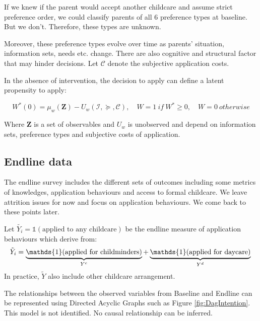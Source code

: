 \documentclass[
]{article}
\newcommand{\one}[1]{\mathds{1}( #1 )}
\begin{document}
If we knew if the parent would accept another childcare and assume strict preference order, we could classify parents of all 6 preference types at baseline. But we don't. Therefore, these types are unknown.

Moreover, these preference types evolve over time as parents' situation, information sets, needs etc. change.
There are also cognitive and structural factor that may hinder decisions. Let \(\mathcal{C}\) denote the subjective application costs.

In the absence of intervention, the decision to apply can define a latent propensity to apply:

\begin{equation}
W^*(0)=\mu_w(\mathbf{Z})-U_w(\mathcal{I},\succeq,\mathcal{C}),\quad W=1 ~ if ~W^*\geq 0,\quad W=0~otherwise
\end{equation}

Where \(\mathbf{Z}\) is a set of observables and \(U_w\) is unobserved and depend on information sets, preference types and subjective costs of application.

\subsection{Endline data}\label{endline-data}

The endline survey includes the different sets of outcomes including some metrics of knowledges, application behaviours and access to formal childcare. We leave attrition issues for now and focus on application behaviours. We come back to these points later.

Let \(\tilde{Y_i}=\one{\text{applied to any childcare}}\) be the endline measure of application behaviours which derive from:
\[
\tilde{Y}_{i}=\underbrace{\one{\text{applied for childminders}}}_{Y^c}+\underbrace{\one{\text{applied for daycare}}}_{Y^d}\\
\]
In practice, \(\tilde{Y}\) also include other childcare arrangement.

The relationships between the observed variables from Baseline and Endline can be represented using Directed Acyclic Graphs such as Figure \ref{fig:DagIntention}. This model is not identified. No causal relationship can be inferred.
\end{document}
